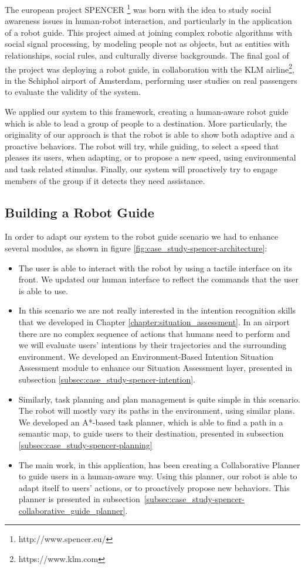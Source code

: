 The european project SPENCER \footnote{http://www.spencer.eu/} was born with the idea to study social awareness issues in human-robot interaction, and particularly in the application of a robot guide. This project aimed at joining complex robotic algorithms  with social signal processing, by modeling people not as objects, but as entities with relationships, social rules, and culturally diverse backgrounds. The final goal of the project was deploying a robot guide, in collaboration with the KLM airline\footnote{https://www.klm.com}, in the Schiphol airport of Amsterdam, performing user studies on real passengers to evaluate the validity of the system.

We applied our system to this framework, creating a human-aware robot guide which is able to lead a group of people to a destination. More particularly, the originality of our approach is that the robot is able to show both adaptive and a proactive behaviors. The robot will try, while guiding, to select a speed that pleases its users, when adapting, or to propose a new speed, using environmental and task related stimulus. Finally, our system will proactively try to engage members of the group if it detects they need assistance. 

\subsection{Building a Robot Guide}
\label{subsec:case_study-spencer-robot_guide}
In order to adapt our system to the robot guide scenario we had to enhance several modules, as shown in figure \ref{fig:case_study-spencer-architecture}: 
\begin{itemize}
\item The user is able to interact with the robot by using a tactile interface on its front. We updated our human interface to reflect the commands that the user is able to use.
\item In this scenario we are not really interested in the intention recognition skills that we developed in Chapter \ref{chapter:situation_assessment}. In an airport there are no complex sequence of actions that humans need to perform and we will evaluate users' intentions by their trajectories and the surrounding environment. We developed an Environment-Based Intention Situation Assessment module to enhance our Situation Assessment layer, presented in subsection \ref{subsec:case_study-spencer-intention}.  
\item Similarly, task planning and plan management is quite simple in this scenario. The robot will mostly vary its paths in the environment, using similar plans. We developed an A*-based task planner, which is able to find a path in a semantic map, to guide users to their destination, presented in subsection \ref{subsec:case_study-spencer-planning} 
\item The main work, in this application, has been creating a Collaborative Planner to guide users in a human-aware way. Using this planner, our robot is able to adapt itself to users' actions, or to proactively propose new behaviors. This planner is presented in subsection~\ref{subsec:case_study-spencer-collaborative_guide_planner}.
\end{itemize} 


